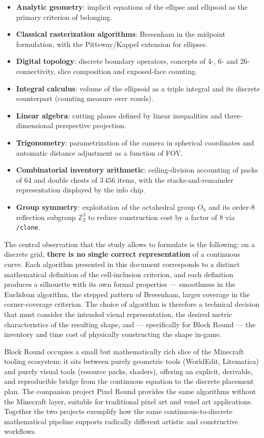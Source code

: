 \documentclass[12pt,a4paper]{scrartcl}
\newcommand{\acc}[1]{\textcolor{accent}{\textbf{#1}}}
\newcommand{\cmd}[1]{\textcolor{earth}{\texttt{\small #1}}}
\begin{document}
\begin{itemize}[leftmargin=1.3em,itemsep=0.25em,topsep=0.4em]
  \item \acc{Analytic geometry}: implicit equations of the ellipse and ellipsoid as the primary criterion of belonging.
  \item \acc{Classical rasterization algorithms}: Bresenham in the midpoint formulation, with the Pitteway/Kappel extension for ellipses.
  \item \acc{Digital topology}: discrete boundary operators, concepts of 4-, 6- and 26-connectivity, slice composition and exposed-face counting.
  \item \acc{Integral calculus}: volume of the ellipsoid as a triple integral and its discrete counterpart (counting measure over voxels).
  \item \acc{Linear algebra}: cutting planes defined by linear inequalities and three-dimensional perspective projection.
  \item \acc{Trigonometry}: parametrization of the camera in spherical coordinates and automatic distance adjustment as a function of FOV.
  \item \acc{Combinatorial inventory arithmetic}: ceiling-division accounting of packs of $64$ and double chests of $3\,456$ items, with the stacks-and-remainder representation displayed by the info chip.
  \item \acc{Group symmetry}: exploitation of the octahedral group $O_h$ and its order-$8$ reflection subgroup $\mathbb{Z}_2^3$ to reduce construction cost by a factor of $8$ via \cmd{/clone}.
\end{itemize}

The central observation that the study allows to formulate is the following: on a discrete grid, \acc{there is no single correct representation} of a continuous curve. Each algorithm presented in this document corresponds to a distinct mathematical definition of the cell-inclusion criterion, and each definition produces a silhouette with its own formal properties --- smoothness in the Euclidean algorithm, the stepped pattern of Bresenham, larger coverage in the corner-coverage criterion. The choice of algorithm is therefore a technical decision that must consider the intended visual representation, the desired metric characteristics of the resulting shape, and --- specifically for Block Round --- the inventory and time cost of physically constructing the shape in-game.

Block Round occupies a small but mathematically rich slice of the Minecraft tooling ecosystem: it sits between purely geometric tools (WorldEdit, Litematica) and purely visual tools (resource packs, shaders), offering an explicit, derivable, and reproducible bridge from the continuous equation to the discrete placement plan. The companion project Pixel Round provides the same algorithms without the Minecraft layer, suitable for traditional pixel art and voxel art applications. Together the two projects exemplify how the same continuous-to-discrete mathematical pipeline supports radically different artistic and constructive workflows.
\end{document}
